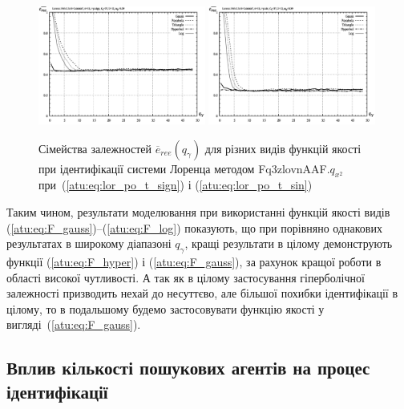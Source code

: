 \begin{figure}[ht!]
  \centerline{
    \includegraphics[width=0.49\textwidth]{p/cha/lor/Fq3zlovnAAF/f_type/lor_Fq3zlovnAAF_qx2_Ft-p_qg_e_all_sign_ree.png}
    \hfill
    \includegraphics[width=0.49\textwidth]{p/cha/lor/Fq3zlovnAAF/f_type/lor_Fq3zlovnAAF_qx2_Ft-p_qg_e_all_sin_ree.png}
  }
  \caption{Сімейства залежностей $ \overline{e}_{ree} (q_\gamma) $ для різних видів функцій якості при ідентифікації системи Лоренца методом Fq3zlovnAAF.$q_{x^2} $ при~(\ref{atu:eq:lor_po_t_sign}) і (\ref{atu:eq:lor_po_t_sin})}
  \label{atu:f:lor_ftype_ree}
\end{figure}

Таким чином, результати моделювання при використанні функцій
якості видів (\ref{atu:eq:F_gauss})--(\ref{atu:eq:F_log}) показують, що при
порівняно однакових результатах в широкому діапазоні
$ q_\gamma $, кращі результати в цілому демонструють функції
(\ref{atu:eq:F_hyper}) і (\ref{atu:eq:F_gauss}), за рахунок кращої роботи в області
високої чутливості. А так як в цілому застосування гіперболічної
залежності призводить нехай до несуттєво, але більшої похибки
ідентифікації в цілому, то в подальшому будемо застосовувати
функцію якості у вигляді~(\ref{atu:eq:F_gauss}).




\subsection{Вплив кількості пошукових агентів на процес ідентифікації} %

